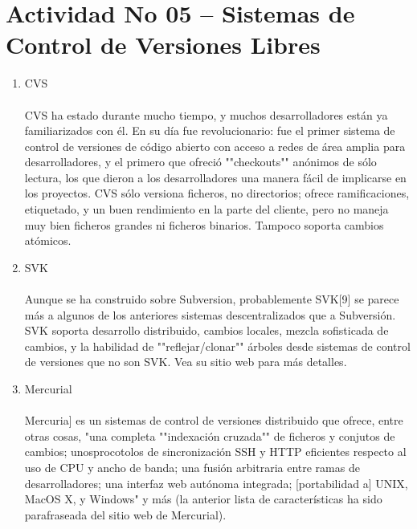 \section{Actividad No 05 – Sistemas de Control de Versiones Libres} 
		
\begin{enumerate}[1.]
	\item CVS
	\\
	\\CVS ha estado durante mucho tiempo, y muchos desarrolladores están ya familiarizados con él. En su día fue revolucionario: fue el primer sistema de control de versiones de código abierto con acceso a redes de área amplia para desarrolladores, y el primero que ofreció ""checkouts"" anónimos de sólo lectura, los que dieron a los desarrolladores una manera fácil de implicarse en los proyectos. CVS sólo versiona ficheros, no directorios; ofrece ramificaciones, etiquetado, y un buen rendimiento en la parte del cliente, pero no maneja muy bien ficheros grandes ni ficheros binarios. Tampoco soporta cambios atómicos.
	

	\item SVK
	\\
	\\Aunque se ha construido sobre Subversion, probablemente SVK[9] se parece más a algunos de los anteriores sistemas descentralizados que a Subversión. SVK soporta desarrollo distribuido, cambios locales, mezcla sofisticada de cambios, y la habilidad de ""reflejar/clonar"" árboles desde sistemas de control de versiones que no son SVK. Vea su sitio web para más detalles.
	

	\item Mercurial
	\\
	\\Mercuria] es un sistemas de control de versiones distribuido que ofrece, entre otras cosas, "una completa ""indexación cruzada"" de ficheros y conjutos de cambios; unosprocotolos de sincronización SSH y HTTP eficientes respecto al uso de CPU y ancho de banda; una fusión arbitraria entre ramas de desarrolladores; una interfaz web autónoma integrada; [portabilidad a] UNIX, MacOS X, y Windows" y más (la anterior lista de características ha sido parafraseada del sitio web de Mercurial).
	


\end{enumerate}
